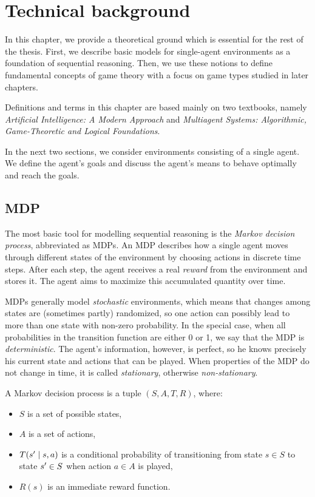 \documentclass[../main.tex]{subfiles}
\begin{document}
\chapter{Technical background}\label{bg}
In this chapter, we provide a theoretical ground which is essential for the rest of the thesis.
First, we describe basic models for single-agent environments as a foundation of sequential reasoning.
Then, we use these notions to define fundamental concepts of game theory with a focus on game types studied in later chapters.

Definitions and terms in this chapter are based mainly on two textbooks, namely \textit{Artificial Intelligence: A Modern Approach}\cite{aima} and \textit{Multiagent Systems: Algorithmic, Game-Theoretic and Logical Foundations}\cite{multiagent}.

In the next two sections, we consider environments consisting of a single agent.
We define the agent's goals and discuss the agent's means to behave optimally and reach the goals.

\section{MDP}\label{bg:mdp}
The most basic tool for modelling sequential reasoning is the \textit{Markov decision process}, abbreviated as MDPs.
An MDP describes how a single agent moves through different states of the environment by choosing actions in discrete time steps.
After each step, the agent receives a real \textit{reward} from the environment and stores it.
The agent aims to maximize this accumulated quantity over time.

MDPs generally model \textit{stochastic} environments, which means that changes among states are (sometimes partly) randomized, so one action can possibly lead to more than one state with non-zero probability.
In the special case, when all probabilities in the transition function are either 0 or 1, we say that the MDP is \textit{deterministic}.
The agent's information, however, is perfect, so he knows precisely his current state and actions that can be played.
When properties of the MDP do not change in time, it is called \textit{stationary}, otherwise \textit{non-stationary}.

\begin{definition}\label{bg:mdp:def}
    A Markov decision process is a tuple $\left(S, A, T, R\right)$, where:
    \begin{itemize}
        \item $S$ is a set of possible states,
        \item $A$ is a set of actions,
        \item $T(s^{\prime} \mid s, a)$ is a conditional probability of transitioning from state $s \in S$ to state $s^{\prime} \in S$ when action $a \in A$ is played,
        \item $R(s)$ is an immediate reward function.
    \end{itemize}
\end{definition}
\end{document}
